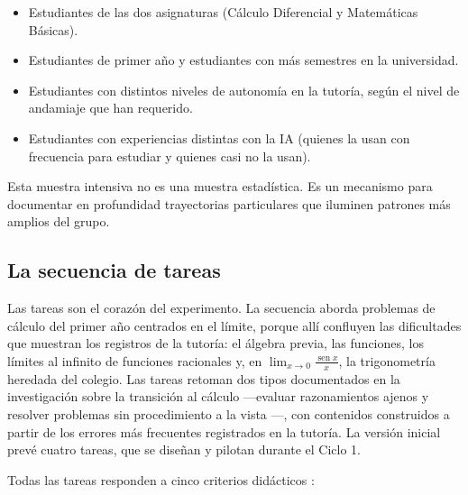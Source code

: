 \begin{itemize}
  \item Estudiantes de las dos asignaturas (Cálculo Diferencial y Matemáticas Básicas).
  \item Estudiantes de primer año y estudiantes con más semestres en la universidad.
  \item Estudiantes con distintos niveles de autonomía en la tutoría, según el nivel de andamiaje que han requerido.
  \item Estudiantes con experiencias distintas con la IA (quienes la usan con frecuencia para estudiar y quienes casi no la usan).
\end{itemize}

Esta muestra intensiva no es una muestra estadística. Es un mecanismo para documentar en profundidad trayectorias particulares que iluminen patrones más amplios del grupo.

\subsection{La secuencia de tareas}

Las tareas son el corazón del experimento. La secuencia aborda problemas de cálculo del primer año centrados en el límite, porque allí confluyen las dificultades que muestran los registros de la tutoría: el álgebra previa, las funciones, los límites al infinito de funciones racionales y, en $\lim_{x\to0}\frac{\operatorname{sen}x}{x}$, la trigonometría heredada del colegio. Las tareas retoman dos tipos documentados en la investigación sobre la transición al cálculo ---evaluar razonamientos ajenos y resolver problemas sin procedimiento a la vista \parencite{vandebrouck2021task}---, con contenidos construidos a partir de los errores más frecuentes registrados en la tutoría. La versión inicial prevé cuatro tareas, que se diseñan y pilotan durante el Ciclo 1.

Todas las tareas responden a cinco criterios didácticos \parencite{leungDesigningMathematicsTasks2015, radmehrTheoreticalFrameworkTask2023, canogullariTaskDesignPrinciples2025}:

